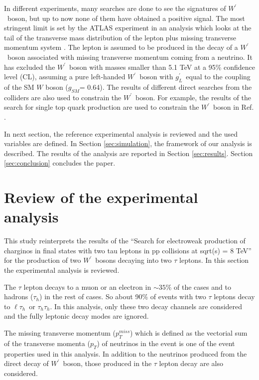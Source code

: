 \documentclass[preprint,showpacs,preprintnumbers]{revtex4}
\newcommand{\wprime}{\ensuremath{W^\prime}~}
\newcommand{\Tau}{\ensuremath{\tau_h}}
\newcommand{\tauTau}{\ensuremath{\tau_h\tau_h}}
\newcommand{\lepTau}{\ensuremath{\ell\tau_h}}
\newcommand{\pt}{\ensuremath{p_T}}
\newcommand{\MET}{\ensuremath{p_T^{miss}}}
\newcommand{\gL}{\ensuremath{g^\prime_L}}
\newcommand{\gSM}{\ensuremath{g_{\scriptscriptstyle SM}}}
\begin{document}
In different experiments, many searches are done to see the signatures of \wprime boson, but up to now none of them have obtained a positive signal.
The most stringent limit is set by the ATLAS experiment in an analysis which looks at the tail of the transverse mass distribution of the lepton plus missing transverse momentum system \cite{Aaboud:2017efa}. The lepton is assumed to be produced in the decay of a \wprime boson associated with missing transverse momentum coming from a neutrino. It has excluded the \wprime boson with masses smaller than 5.1 TeV at a 95\% confidence level (CL), assuming a pure left-handed \wprime boson with \gL ~equal to the coupling of the SM $W$ boson (\gSM = 0.64).  The results of different direct searches from the colliders are also used to constrain the \wprime boson. For example, the results of the search for single top quark production are used to constrain the \wprime boson in Ref. \cite{YaserAyazi:2017xyj}.



In next section, the reference experimental analysis is reviewed and the used variables are defined. In Section \ref{sec:simulation}, the framework of our analysis is described. The results of the analysis are reported in Section \ref{sec:results}. Section \ref{sec:conclusion} concludes the paper.

\section{Review of the experimental analysis}
This study reinterprets the results of the ``Search for electroweak production of charginos in final states with two tau leptons in pp collisions at sqrt(s) = 8 TeV''\cite{Khachatryan:2016trj} for the production of two \wprime bosons decaying into two $\tau$ leptons. In this section the experimental analysis is reviewed.

The $\tau$ lepton decays  to a muon or an electron in $\sim 35\%$ of the cases and to hadrons (\Tau) in the rest of cases. So about 90\% of events with two $\tau$ leptons decay to \lepTau ~or \tauTau. In this analysis, only these two decay channels are considered and the fully leptonic decay modes are ignored. 

The missing transverse momentum (\MET) which is  defined as the vectorial sum of the transverse momenta (\pt) of neutrinos in the event is one of the event properties used in this analysis. In addition to the neutrinos  produced from the direct decay of \wprime boson, those produced in the $\tau$ lepton decay are also considered.
\end{document}
